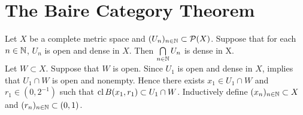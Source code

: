 \documentclass{book}
\begin{document}
\newpage
\section{The Baire Category Theorem}

\begin{ex} 
	Let $X$ be a complete metric space and $(U_n)_{n \in \mathbb{N}} \subset \mathcal{P}(X)$. Suppose that for each $n \in \mathbb{N}$, $U_n$ is open and dense in $X$. Then $\bigcap\limits_{n \in \mathbb{N}} U_n$ is dense in X. \\
	 Let $W \subset X$. Suppose that $W$ is open. Since $U_1$ is open and dense in $X$,  implies that $U_1 \cap W$ is open and nonempty. Hence there exists $x_1 \in U_1 \cap W$ and $r_1 \in (0, 2^{-1})$ such that $\operatorname{cl} B(x_1, r_1) \subset U_1 \cap W$. Inductively define $(x_n)_{n \in \mathbb{N}} \subset X$ and $(r_n)_{n \in \mathbb{N}} \subset (0,1)$.
\end{ex}
\end{document}
